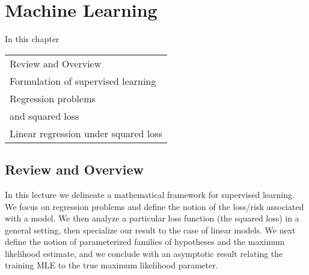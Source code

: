 

\chapter{Machine Learning}
\begin{margintable}\vspace{.8in}
    In this chapter
    
    \begin{tabularx}{\marginparwidth}{|X}
    Review and Overview\\
    Formulation of supervised learning\\
    Regression problems \\and squared loss\\
    Linear regression under squared loss\\
    \end{tabularx}
\end{margintable}

\newcommand{\cX}{\mathcal{X}}
\newcommand{\cY}{\mathcal{Y}}

\section{Review and Overview}
In this lecture we delineate a mathematical framework for supervised learning. We focus on regression problems and define the notion of the loss/risk associated with a model. We then analyze a particular loss function (the squared loss) in a general setting, then specialize our result to the case of linear models. We next define the notion of parameterized families of hypotheses and the maximum likelihood estimate, and we conclude with an asymptotic result relating the training MLE to the true maximum likelihood parameter.

